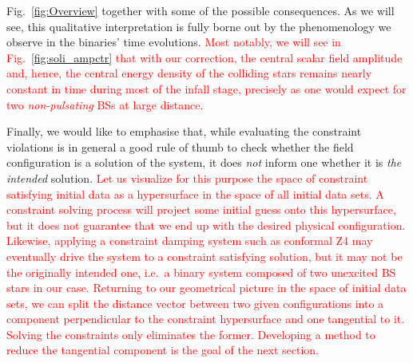 \documentclass[]{iopart}
\newcommand{\new}[1]{\textcolor{red}{#1}}
\begin{document}
%
Fig.~\ref{fig:Overview} together with some of the possible consequences.
As we will see, this qualitative interpretation is fully borne out
by the phenomenology we observe in the binaries' time evolutions.
\new{Most notably, we will see in Fig.~\ref{fig:soli_ampctr}
that with our correction,
the central scalar field amplitude and, hence,
the central energy density of the colliding stars
remains nearly constant in time during most of the infall
stage, precisely as one would expect for two
{\it non-pulsating} BSs at large distance.}

Finally, we would like to emphasise that, while evaluating the
constraint violations is in general a good rule of thumb to check
whether the field configuration is a solution of the system, it
does \emph{not} inform one whether it is \emph{the intended} solution.
\new{Let us visualize for this purpose the space of constraint satisfying
initial data as a hypersurface in the space of all initial data sets.
A constraint solving process will project some initial guess onto
this hypersurface, but it does not guarantee that we end up with
the desired physical configuration. Likewise, applying a constraint
damping system such as conformal Z4 \cite{Bernuzzi:2009ex,Alic:2011gg}
may eventually drive the system to a constraint satisfying
solution, but it may not be the originally intended one, i.e.~a
binary system composed of two unexcited BS stars in our case.
Returning to our geometrical picture in the space of initial data sets, we can
split the distance vector between two given configurations into a component
perpendicular to the constraint hypersurface and one tangential to it.
Solving the constraints only eliminates the former.
Developing a method to reduce the tangential component is the goal
of the next section.}



\end{document}
